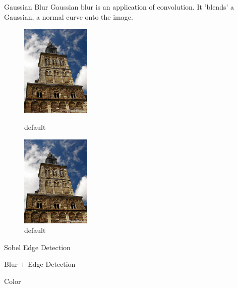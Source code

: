 \documentclass{beamer}
\begin{document}
\begin{frame}{Gaussian Blur}
Gaussian blur is an application of  convolution. It 'blends' a Gaussian, a normal curve onto the image. 

\begin{figure}[ht]
\begin{minipage}[b]{0.1\linewidth}
\includegraphics[width=1.3in]{churchin.jpg}
\caption{default}
\label{fig:figure1}
\end{minipage}
\hspace{2.0in}
\begin{minipage}[b]{0.1\linewidth}
\centering
\includegraphics[width=1.3in]{churchin.jpg}
\caption{default}
\label{fig:figure2}
\end{minipage}
\end{figure}


\end{frame}

\begin{frame}{Sobel Edge Detection}

\end {frame}

\begin{frame}{Blur + Edge Detection}

\end{frame}


\begin{frame}{Color}

\end{frame}
\end{document}

